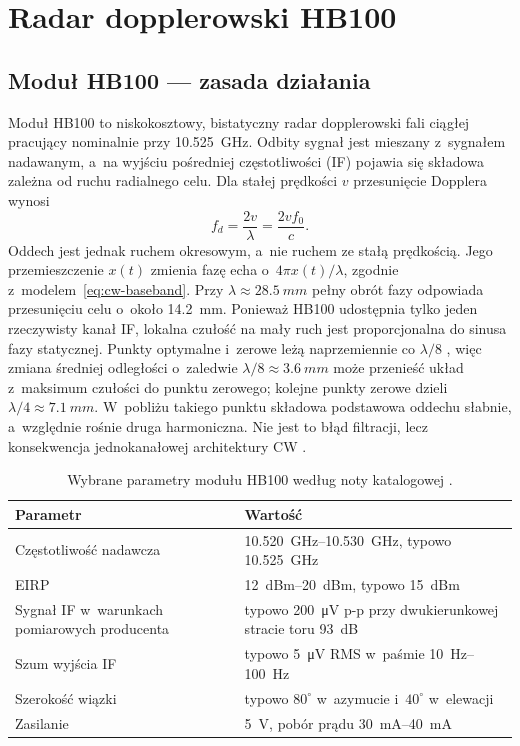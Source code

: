 \documentclass[12pt,a4paper,oneside]{report}
\begin{document}
\chapter{Radar dopplerowski HB100}
\label{chap:hb100}

\section{Moduł HB100 --- zasada działania}
Moduł HB100 to niskokosztowy, bistatyczny radar dopplerowski fali ciągłej
pracujący nominalnie przy \SI{10.525}{GHz}. Odbity sygnał jest mieszany
z~sygnałem nadawanym, a~na wyjściu pośredniej częstotliwości (IF) pojawia się
składowa zależna od ruchu radialnego celu. Dla stałej prędkości $v$ przesunięcie
Dopplera wynosi
\begin{equation}
  f_d=\frac{2v}{\lambda}=\frac{2vf_0}{c}.
  \label{eq:hb100-doppler}
\end{equation}
Oddech jest jednak ruchem okresowym, a~nie ruchem ze stałą prędkością. Jego
przemieszczenie $x(t)$ zmienia fazę echa o~$4\pi x(t)/\lambda$, zgodnie
z~modelem~\eqref{eq:cw-baseband}. Przy $\lambda\approx\SI{28.5}{mm}$ pełny
obrót fazy odpowiada przesunięciu celu o~około \SI{14.2}{mm}. Ponieważ HB100
udostępnia tylko jeden rzeczywisty kanał IF, lokalna czułość na mały ruch jest
proporcjonalna do sinusa fazy statycznej. Punkty optymalne i~zerowe leżą
naprzemiennie co $\lambda/8$ \cite{mercuri2017}, więc zmiana średniej
odległości o~zaledwie $\lambda/8\approx\SI{3.6}{mm}$ może przenieść układ
z~maksimum czułości do punktu zerowego; kolejne punkty zerowe dzieli
$\lambda/4\approx\SI{7.1}{mm}$. W~pobliżu takiego punktu składowa podstawowa
oddechu słabnie, a~względnie rośnie druga harmoniczna. Nie jest to błąd
filtracji, lecz konsekwencja jednokanałowej architektury CW
\cite{droitcour2004}.

\begin{table}[H]
\centering
\caption{Wybrane parametry modułu HB100 według noty katalogowej
\cite{hb100_doc}.}
\label{tab:hb100-spec}
\small
\begin{tabular}{@{}p{5.7cm}p{7.0cm}@{}}
\toprule
Parametr & Wartość \\
\midrule
Częstotliwość nadawcza & \SIrange{10.520}{10.530}{GHz}, typowo
\SI{10.525}{GHz} \\
EIRP & \SIrange{12}{20}{dBm}, typowo \SI{15}{dBm} \\
Sygnał IF w~warunkach pomiarowych producenta & typowo
\SI{200}{\micro\volt} p-p przy dwukierunkowej stracie toru \SI{93}{dB} \\
Szum wyjścia IF & typowo \SI{5}{\micro\volt} RMS w~paśmie
\SIrange{10}{100}{Hz} \\
Szerokość wiązki & typowo $80^\circ$ w~azymucie i~$40^\circ$ w~elewacji \\
Zasilanie & \SI{5}{V}, pobór prądu \SIrange{30}{40}{mA} \\
\bottomrule
\end{tabular}
\end{table}
\end{document}

